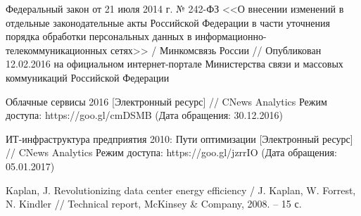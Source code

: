 \begin{thebibliography}{00}
    Федеральный закон от 21 июля 2014 г. № 242-ФЗ <<О внесении изменений в отдельные законодательные акты Российской Федерации в части уточнения порядка обработки персональных данных в информационно-телекоммуникационных сетях>> /
    Минкомсвязь России //
    Опубликован 12.02.2016 на официальном интернет-портале Министерства связи и массовых коммуникаций Российской Федерации

    Облачные сервисы 2016
    [Электронный ресурс] //
    CNews Analytics
    Режим доступа: https://goo.gl/cmDSMB
    (Дата обращения: 30.12.2016)

    ИТ-инфраструктура предприятия 2010: Пути оптимизации
    [Электронный ресурс] //
    CNews Analytics
    Режим доступа: https://goo.gl/jzrrIO
    (Дата обращения: 05.01.2017)

    Kaplan, J.
    Revolutionizing data center energy efficiency /
    J. Kaplan, W. Forrest, N. Kindler //
    Technical report, McKinsey \& Company, 2008. -- 15 с.

\end{thebibliography}
\endgroup

\clearpage
